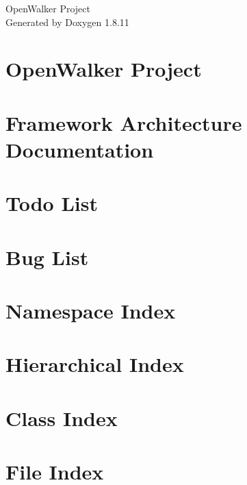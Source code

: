 \documentclass[twoside]{book}
\newcommand{\+}{\discretionary{\mbox{\scriptsize$\hookleftarrow$}}{}{}}
\newcommand{\clearemptydoublepage}{%
  \newpage{\pagestyle{empty}\cleardoublepage}%
}
\begin{document}
\hypersetup{pageanchor=false,
             bookmarksnumbered=true,
             pdfencoding=unicode
            }
\begin{titlepage}
\vspace*{7cm}
\begin{center}%
{\Large Open\+Walker Project }\\
\vspace*{1cm}
{\large Generated by Doxygen 1.8.11}\\
\end{center}
\end{titlepage}
\clearemptydoublepage
\tableofcontents
\clearemptydoublepage
{}
\hypersetup{pageanchor=true}

\chapter{Open\+Walker Project}
\label{index}\hypertarget{index}{}
\chapter{Framework Architecture Documentation}
\label{FrameworkArchitecturePage}
\hypertarget{FrameworkArchitecturePage}{}

\chapter{Todo List}
\label{todo}
\hypertarget{todo}{}

\chapter{Bug List}
\label{bug}
\hypertarget{bug}{}

\chapter{Namespace Index}

\chapter{Hierarchical Index}

\chapter{Class Index}

\chapter{File Index}

\end{document}
